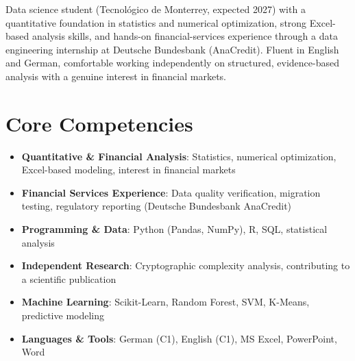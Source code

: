 \documentclass[11pt,a4paper,sans]{moderncv}
\begin{document}
\makecvtitle


\vspace{6pt}
\small{Data science student (Tecnológico de Monterrey, expected 2027) with a quantitative foundation in statistics and numerical optimization, strong Excel-based analysis skills, and hands-on financial-services experience through a data engineering internship at Deutsche Bundesbank (AnaCredit). Fluent in English and German, comfortable working independently on structured, evidence-based analysis with a genuine interest in financial markets.}


\section{Core Competencies}
\vspace{1pt}
\begin{itemize}

\item \textbf{Quantitative \& Financial Analysis}: Statistics, numerical optimization, Excel-based modeling, interest in financial markets

\item \textbf{Financial Services Experience}: Data quality verification, migration testing, regulatory reporting (Deutsche Bundesbank AnaCredit)

\item \textbf{Programming \& Data}: Python (Pandas, NumPy), R, SQL, statistical analysis

\item \textbf{Independent Research}: Cryptographic complexity analysis, contributing to a scientific publication

\item \textbf{Machine Learning}: Scikit-Learn, Random Forest, SVM, K-Means, predictive modeling

\item \textbf{Languages \& Tools}: German (C1), English (C1), MS Excel, PowerPoint, Word

\end{itemize}

\end{document}
